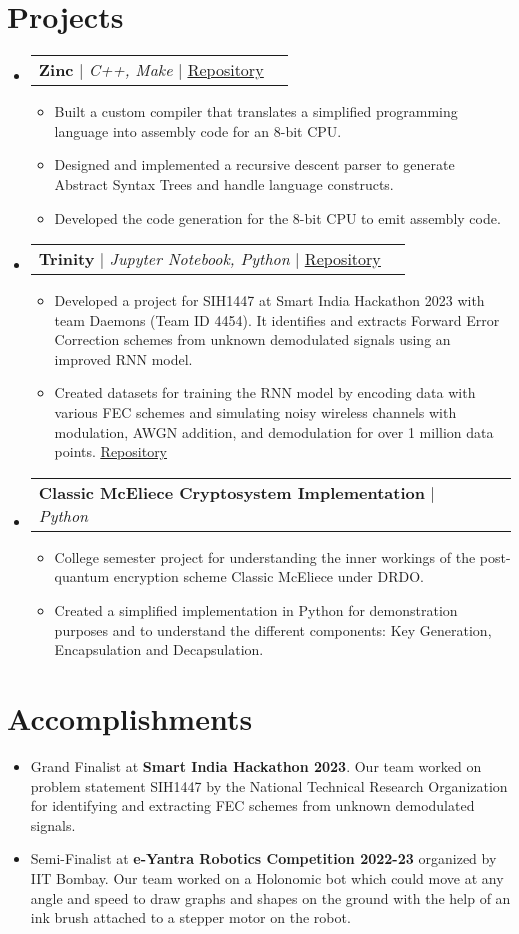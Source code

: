 \documentclass[letterpaper,11pt]{article}
\makeatletter
\newcommand{\resumeItem}[1]{
  \item\small{
    {#1 \vspace{-2pt}}
  }
}
\newcommand{\resumeProjectHeading}[2]{
    \item
    \begin{tabular*}{1.001\textwidth}{l@{\extracolsep{\fill}}r}
      \small#1 & \textbf{\small #2}\\
    \end{tabular*}\vspace{-7pt}
}
\newcommand{\resumeSubHeadingListStart}{\begin{itemize}[leftmargin=0.0in, label={}]}
\newcommand{\resumeSubHeadingListEnd}{\end{itemize}}
\newcommand{\resumeItemListStart}{\begin{itemize}}
\newcommand{\resumeItemListEnd}{\end{itemize}\vspace{-5pt}}
\makeatother
\begin{document}
\section{Projects}
    \vspace{-5pt}
    \resumeSubHeadingListStart
      \resumeProjectHeading
          {\textbf{Zinc} $|$ \emph{C++, Make} $|$ \href{https://github.com/MashyBasker/zinc}{\underline{Repository}}}{}
          \resumeItemListStart
            \resumeItem{Built a custom compiler that translates a simplified programming language into assembly code for an 8-bit CPU.}
            \resumeItem{Designed and implemented a recursive descent parser to generate Abstract Syntax Trees and handle language constructs.}
            \resumeItem{Developed the code generation for the 8-bit CPU to emit assembly code.}
          \resumeItemListEnd
          \vspace{-13pt}
      \resumeProjectHeading
          {\textbf{Trinity} $|$ \emph{Jupyter Notebook, Python} $|$ \href{https://github.com/MashyBasker/Trinity}{\underline{Repository}}}{}
          \resumeItemListStart
            \resumeItem{Developed a project for SIH1447 at Smart India Hackathon 2023 with team Daemons (Team ID 4454). It identifies and extracts Forward Error Correction schemes from unknown demodulated signals using an improved RNN model.}
            \resumeItem{Created datasets for training the RNN model by encoding data with various FEC schemes and simulating noisy wireless channels with modulation, AWGN addition, and demodulation for over 1 million data points. \href{https://github.com/FEC-SIH-23/data}{\underline{Repository}}}
          \resumeItemListEnd 
          \vspace{-13pt}
          \resumeProjectHeading
          {\textbf{Classic McEliece Cryptosystem Implementation} $|$ \emph{Python}}{}
          \resumeItemListStart
            \resumeItem{College semester project for understanding the inner workings of the post-quantum encryption scheme Classic McEliece under DRDO.}
            \resumeItem{Created a simplified implementation in Python for demonstration purposes and to understand the different components: Key Generation, Encapsulation and Decapsulation.}
          \resumeItemListEnd 
    \resumeSubHeadingListEnd
\vspace{-15pt}
\section{Accomplishments}
\resumeItemListStart
    \resumeItem{Grand Finalist at \textbf{Smart India Hackathon 2023}. Our team 
    worked on problem statement SIH1447 by the National Technical Research Organization for identifying and extracting FEC schemes from unknown demodulated signals.}
    \resumeItem{Semi-Finalist at \textbf{e-Yantra Robotics Competition 2022-23} organized by IIT Bombay. Our team worked on a Holonomic bot which could move at any angle and speed to draw graphs and shapes on the ground with the help of an ink brush attached to a stepper motor on the robot.}
\resumeItemListEnd
%
\vspace{5pt}
\end{document}
